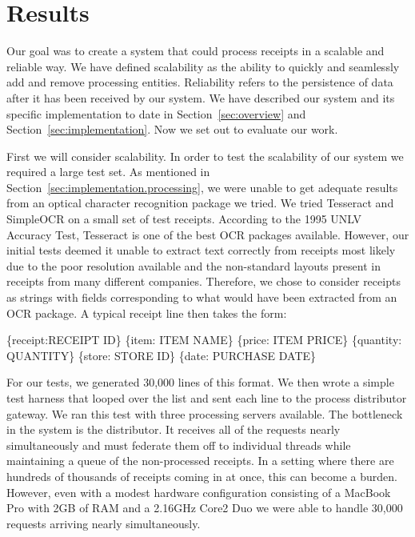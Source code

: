 \section{Results}
\label{sec:results}

Our goal was to create a system that could process receipts in a
scalable and reliable way. We have defined scalability as the ability
to quickly and seamlessly add and remove processing
entities. Reliability refers to the persistence of data after it has
been received by our system. We have described our system and its
specific implementation to date in Section~\ref{sec:overview} and
Section~\ref{sec:implementation}. Now we set out to evaluate our work.

First we will consider scalability. In order to test the scalability
of our system we required a large test set. As mentioned in
Section~\ref{sec:implementation.processing}, we were unable to get
adequate results from an optical character recognition package we
tried. We tried Tesseract and SimpleOCR on a small set of test
receipts. According to the 1995 UNLV Accuracy Test, Tesseract is
one of the best OCR packages available. However, our initial tests
deemed it unable to extract text correctly from receipts most likely
due to the poor resolution available and the non-standard layouts
present in receipts from many different companies. Therefore, we chose to consider receipts as strings with fields corresponding to what would have been extracted from an OCR package. A typical receipt line then takes the form:

\begin{centering}
\{receipt:RECEIPT ID\} \{item: ITEM NAME\} \{price: ITEM PRICE\} \{quantity: QUANTITY\} \{store: STORE ID\} \{date: PURCHASE DATE\}
\end{centering}

For our tests, we generated 30,000 lines of this format. We then
wrote a simple test harness that looped over the list and sent each
line to the process distributor gateway. We ran this test with three
processing servers available. The bottleneck in the system is the
distributor. It receives all of the requests nearly simultaneously and
must federate them off to individual threads while maintaining a queue
of the non-processed receipts. In a setting where there are hundreds
of thousands of receipts coming in at once, this can become a
burden. However, even with a modest hardware configuration consisting
of a MacBook Pro with 2GB of RAM and a 2.16GHz Core2 Duo we were able
to handle 30,000 requests arriving nearly simultaneously. 


